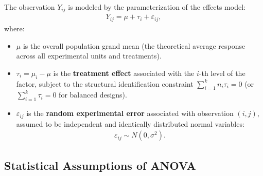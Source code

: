 The observation $Y_{ij}$ is modeled by the parameterization of the effects model:
\begin{align}
	Y_{ij} = \mu + \tau_i + \varepsilon_{ij},
\end{align}
where:
\begin{itemize}
	\item $\mu$ is the overall population grand mean (the theoretical average response across all experimental units and treatments).
	\item $\tau_i = \mu_i - \mu$ is the \textbf{treatment effect} associated with the $i$-th level of the factor, subject to the structural identification constraint $\sum_{i=1}^k n_i \tau_i = 0$ (or $\sum_{i=1}^k \tau_i = 0$ for balanced designs).
	\item $\varepsilon_{ij}$ is the \textbf{random experimental error} associated with observation $(i,j)$, assumed to be independent and identically distributed normal variables:
	\begin{align}
		\varepsilon_{ij} \sim N(0, \sigma^2).
	\end{align}
\end{itemize}

\subsection{Statistical Assumptions of ANOVA}

